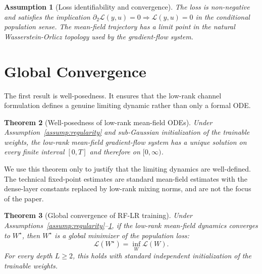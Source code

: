 \documentclass{article}
\newtheorem{theorem}{Theorem}[section]
\newtheorem{assumption}[theorem]{Assumption}
\newcommand{\calL}{\mathcal{L}}
\newcommand{\scrL}{\mathcal{L}}
\begin{document}
\begin{assumption}[Loss identifiability and convergence]
\label{assump:loss}
The loss is non-negative and satisfies the implication $\partial_2\calL(y,u)=0\Rightarrow \calL(y,u)=0$ in the conditional population sense. The mean-field trajectory has a limit point in the natural Wasserstein-Orlicz topology used by the gradient-flow system.
\end{assumption}

\section{Global Convergence}
\label{sec:global-convergence}

The first result is well-posedness. It ensures that the low-rank channel formulation defines a genuine limiting dynamic rather than only a formal ODE.

\begin{theorem}[Well-posedness of low-rank mean-field ODEs]
\label{thm:wellposed}
Under Assumption~\ref{assump:regularity} and sub-Gaussian initialization of the trainable weights, the low-rank mean-field gradient-flow system has a unique solution on every finite interval $[0,T]$ and therefore on $[0,\infty)$.
\end{theorem}

We use this theorem only to justify that the limiting dynamics are well-defined. The technical fixed-point estimates are standard mean-field estimates with the dense-layer constants replaced by low-rank mixing norms, and are not the focus of the paper.

\begin{theorem}[Global convergence of RF-LR training]
\label{thm:convergence}
Under Assumptions~\ref{assump:regularity}--\ref{assump:loss}, if the low-rank mean-field dynamics converges to $W^\star$, then $W^\star$ is a global minimizer of the population loss:
\begin{equation}
\scrL(W^\star)=\inf_W \scrL(W).
\end{equation}
For every depth $L\ge2$, this holds with standard independent initialization of the trainable weights.
\end{theorem}
\end{document}
